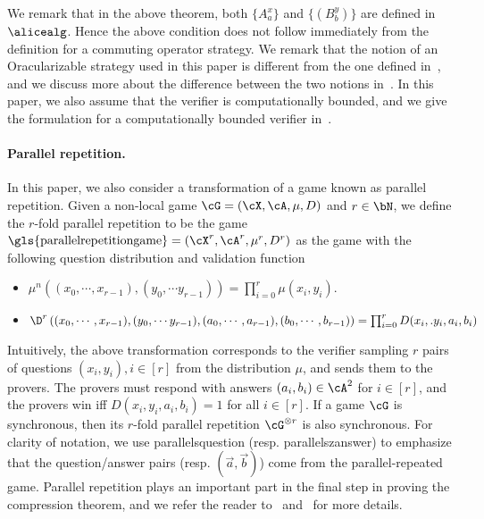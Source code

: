 We remark that in the above theorem, both $\{ A_{a}^x \}$ and $\{ (B_{b}^y) \}$ are defined in $\alicealg$. Hence the above condition does not follow immediately from the definition for a commuting operator strategy. We remark that the notion of an Oracularizable strategy used in this paper is different from the one defined in~\cite[Definition 2.14]{mousaviNonlocalGamesCompression2022}, and we discuss more about the difference between the two notions in~. In this paper, we also assume that the verifier is computationally bounded, and we give the formulation for a computationally bounded verifier in~.

\paragraph{Parallel repetition. } In this paper, we also consider a transformation of a game known as parallel repetition. Given a non-local game $\cG = (\cX, \cA, \mu, D)$ and $r \in \bN$, we define the $r$-fold parallel repetition to be the game $\text{\gls{parallelrepetitiongame}} = (\cX^r, \cA^r, \mu^r, D^r)$ as the game with the following question distribution and validation function
\begin{itemize}
	\item $\mu^n((x_0, \cdots, x_{r-1}), (y_0, \cdots y_{r-1})) = \prod_{i = 0}^{r} \mu(x_i, y_i)$.
	\item  $\D^r\left((x_0, \cdots, x_{r-1}), (y_0, \cdots y_{r-1}), (a_0, \cdots , a_{r-1}),(b_0, \cdots , b_{r-1})\right) =\prod_{i = 0}^{r} D(x_i,. y_i, a_i,b_i)$
\end{itemize}
Intuitively, the above transformation corresponds to the verifier sampling $r$ pairs of questions $(x_i, y_i), i \in [r]$ from the distribution $\mu$, and sends them to the provers. The provers must respond with answers $(a_i,b_i) \in \cA^2$ for $i \in [r]$, and the provers win iff $D(x_i,y_i,a_i,b_i) = 1$ for all $i \in [r]$. If a game $\cG$ is synchronous, then its $r$-fold parallel repetition $\cG^{\otimes r}$ is also synchronous. For clarity of notation, we use \gls{parallelsquestion} (resp. \gls{parallelszanswer}) to emphasize that the question/answer pairs (resp. $(\vec{a}, \vec{b})$) come from the parallel-repeated game. Parallel repetition plays an important part in the final step in proving the compression theorem, and we refer the reader to~ and~ for more details. 

